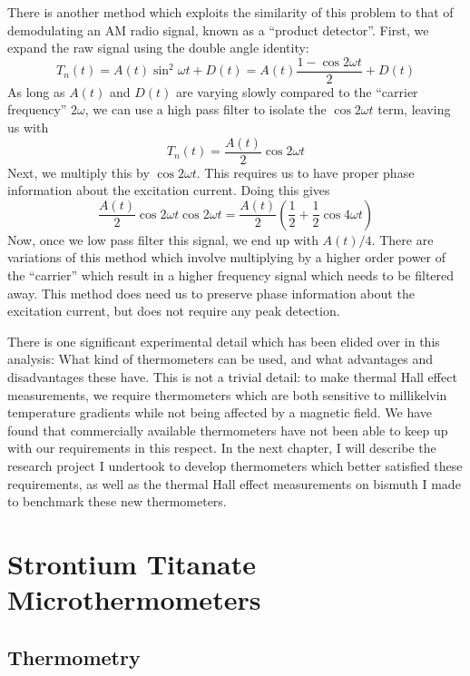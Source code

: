 \documentclass{thesis-umich}
\begin{document}
There is another method which exploits the similarity of this problem to that of demodulating an AM radio signal, known as a ``product detector''. First, we expand the raw signal using the double angle identity:
\[T_n(t) = A(t) \sin^2 \omega t + D(t) = A(t) \frac{1 - \cos 2 \omega t}{2} + D(t)\]
As long as $A(t)$ and $D(t)$ are varying slowly compared to the ``carrier frequency'' $2\omega$, we can use a high pass filter to isolate the $\cos 2\omega t$ term, leaving us with
\[T_n(t) = \frac{A(t)}{2}\cos 2\omega t\]
Next, we multiply this by $\cos 2 \omega t$. This requires us to have proper phase information about the excitation current. Doing this gives
\[ \frac{A(t)}{2} \cos 2 \omega t \cos 2 \omega t = \frac{A(t)}{2}\left(\frac{1}{2} + \frac{1}{2} \cos 4 \omega t \right) \]
Now, once we low pass filter this signal, we end up with $A(t)/4$. There are variations of this method which involve multiplying by a higher order power of the ``carrier'' which result in a higher frequency signal which needs to be filtered away. This method does need us to preserve phase information about the excitation current, but does not require any peak detection.

There is one significant experimental detail which has been elided over in this analysis: What kind of thermometers can be used, and what advantages and disadvantages these have. This is not a trivial detail: to make thermal Hall effect measurements, we require thermometers which are both sensitive to millikelvin temperature gradients while not being affected by a magnetic field. We have found that commercially available thermometers have not been able to keep up with our requirements in this respect. In the next chapter, I will describe the research project I undertook to develop thermometers which better satisfied these requirements, as well as the thermal Hall effect measurements on bismuth I made to benchmark these new thermometers.

\chapter{Strontium Titanate Microthermometers}


\section{Thermometry}
\end{document}
